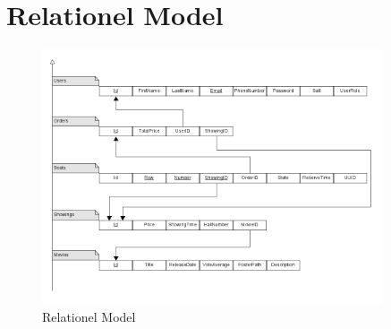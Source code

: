 \chapter{Relationel Model}\label{app:relationelmodel}
\begin{figure}[!h]
    \centering
    \includegraphics[width=0.9\textwidth]{bilag/RelationelModel.png}
    \caption{Relationel Model}
\end{figure}